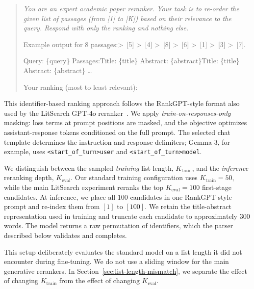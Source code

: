 \documentclass[pdflatex,sn-basic,Numbered]{sn-jnl}%
\theoremstyle{thmstyleone}%
\theoremstyle{thmstyletwo}%
\theoremstyle{thmstylethree}%
\begin{document}
\begin{quote}\small\itshape
You are an expert academic paper reranker. Your task is to re-order the given list of
passages (from [1] to [K]) based on their relevance to the query. Respond with only
the ranking and nothing else.
\par\vspace{2pt}
Example output for 8 passages:\newline[2] \textgreater\ [5] \textgreater\ [4] \textgreater\ [8]
\textgreater\ [6] \textgreater\ [1] \textgreater\ [3] \textgreater\ [7].
\par\vspace{2pt}
Query: \{query\}\newline
Passages:\newline[1] Title: \{title\} Abstract: \{abstract\}\newline
[2] Title: \{title\} Abstract: \{abstract\} \dots
\par\vspace{2pt}
Your ranking (most to least relevant):
\end{quote}

This identifier-based ranking approach follows the RankGPT-style format also
used by the LitSearch GPT-4o reranker~\cite{Ajith}. We apply
\emph{train-on-responses-only} masking: loss terms at prompt positions are masked,
and the objective optimizes assistant-response tokens conditioned on the full
prompt. The selected chat
template determines the instruction and response delimiters; Gemma 3, for
example, uses \texttt{<start\_of\_turn>user} and
\texttt{<start\_of\_turn>model}.

We distinguish between the sampled \emph{training} list length,
$K_{\mathrm{train}}$, and the \emph{inference} reranking depth,
$K_{\mathrm{eval}}$. Our standard training configuration uses
$K_{\mathrm{train}}=50$, while the main LitSearch experiment reranks the top
$K_{\mathrm{eval}}=100$ first-stage candidates. At inference, we place all 100
candidates in one RankGPT-style prompt and re-index them from $[1]$ to $[100]$.
We retain the title-abstract representation used in training and truncate each
candidate to approximately 300 words. The model returns a raw permutation
of identifiers, which the parser described below validates and completes.

This setup deliberately evaluates the standard model on a list length it did not
encounter during fine-tuning. We do not use a sliding window for the main
generative rerankers. In Section~\ref{sec:list-length-mismatch}, we separate the
effect of changing $K_{\mathrm{train}}$ from the effect of changing
$K_{\mathrm{eval}}$.
\end{document}
